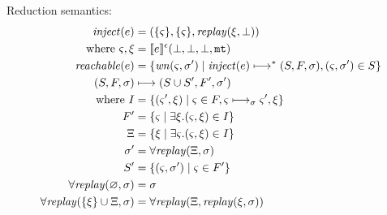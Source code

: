 \documentclass{llncs}
\newcommand{\inject}{\mathit{inject}}
\newcommand{\setof}[1]{\{ #1 \}}
\begin{document}
Reduction semantics:
\begin{align*}
\inject(\mexp) &= (\setof{\mstate}, \setof{\mstate}, \replay(\msdiff,\bot)) \\
 \text{ where } \mstate, \msdiff &= \compile{e}^{\mtcntr}(\bot,\bot,\bot,\kmt) \\
\reachable{\mexp} &= \setof{\wn(\mstate,\msto') \mid
                             \inject(\mexp) \machstep^* (S,F,\msto),
                             \ttuple{\mstate}{\msto'} \in S} \\
(S,F,\msto) &\machstep (S \cup S', F', \msto') \\
 \text{ where } I &=
   \setof{ \ttuple{\mstate'}{\msdiff} \mid \mstate \in F, \mstate \machstep_\msto \mstate', \msdiff} \\
   F' &= \setof{\mstate \mid \exists \msdiff. \ttuple{\mstate}{\msdiff} \in I} \\
   \Xi &= \setof{\msdiff \mid \exists \mstate. \ttuple{\mstate}{\msdiff} \in I} \\
   \msto' &= \replayall(\Xi,\msto) \\
   S' &= \setof{\ttuple{\mstate}{\msto'} \mid \mstate \in F'} \\
   \replayall(\varnothing,\msto) &= \msto \\
   \replayall(\setof{\msdiff} \cup \Xi, \msto) &= \replayall(\Xi, \replay(\msdiff, \msto))
\end{align*}

\end{document}
